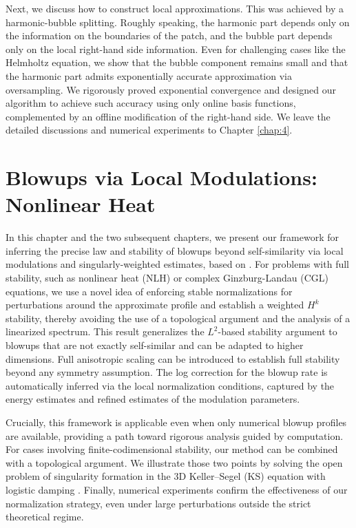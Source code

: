 \documentclass[12pt]{caltech_thesis}
\numberwithin{equation}{section}
\begin{document}
Next, we discuss how to construct local approximations. This was achieved by a harmonic-bubble splitting. Roughly speaking, the harmonic part depends only on the information on the boundaries of the patch, and the bubble part depends only on the local right-hand side information. Even for challenging cases like the Helmholtz equation, we show that the bubble component remains small and that the harmonic part admits exponentially accurate approximation via oversampling. We rigorously proved exponential convergence and designed our algorithm to achieve such accuracy using only online basis functions, complemented by an offline modification of the right-hand side. We leave the detailed discussions and numerical experiments to Chapter \ref{chap:4}.


\chapter{Blowups via Local Modulations: Nonlinear Heat}
\label{chap:2}
In this chapter and the two subsequent chapters, we present our framework for inferring the precise law and stability of blowups beyond self-similarity via local modulations and singularly-weighted estimates, based on \cite{hou20242, chen2024stability, liu2025finite}. For problems with full stability, such as nonlinear heat (NLH) \cite{hou20242} or complex Ginzburg-Landau (CGL) \cite{chen2024stability} equations, we use a novel idea of enforcing stable normalizations for perturbations around the approximate profile and establish a weighted $H^k$ stability, thereby avoiding the use of a topological argument and the analysis of a linearized spectrum. This result generalizes the $L^2$-based stability argument to blowups that are not exactly self-similar and can be adapted to higher dimensions. Full anisotropic scaling can be introduced to establish full stability beyond any symmetry assumption. The log correction for the blowup rate is {automatically inferred via the local normalization conditions,} captured by the energy estimates and refined estimates of the modulation parameters.  

Crucially, this framework is applicable even when only numerical blowup profiles are available, providing a path toward rigorous analysis guided by computation. For cases involving finite-codimensional stability, our method can be combined with a topological argument. We illustrate those two points by solving the open problem of singularity formation in the 3D Keller–Segel (KS) equation with logistic damping \cite{liu2025finite}. Finally, numerical experiments confirm the effectiveness of our normalization strategy, even under large perturbations outside the strict theoretical regime.
\end{document}
